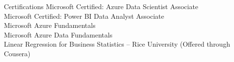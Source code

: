 \documentclass{resume} %
\begin{document}
\begin{rSection}{Certifications}
Microsoft Certified: Azure Data Scientist Associate\\
Microsoft Certified: Power BI Data Analyst Associate \\
Microsoft Azure Fundamentals \\
Microsoft Azure Data Fundamentals\\
Linear Regression for Business Statistics – Rice University (Offered through Cousera) 
\\


\end{rSection}




\end{document}
